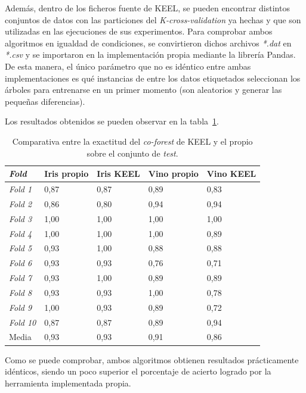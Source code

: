 Además, dentro de los ficheros fuente de KEEL, se pueden encontrar distintos conjuntos de datos con las particiones del \textit{K-cross-validation} ya hechas y que son utilizadas en las ejecuciones de sus experimentos. Para comprobar ambos algoritmos en igualdad de condiciones, se convirtieron dichos archivos \textit{*.dat} en \textit{*.csv} y se importaron en la implementación propia mediante la librería Pandas. De esta manera, el único parámetro que no es idéntico entre ambas implementaciones es qué instancias de entre los datos etiquetados seleccionan los árboles para entrenarse en un primer momento (son aleatorios y generar las pequeñas diferencias).

Los resultados obtenidos se pueden observar en la tabla~\ref{tabla_coforest_keelvsnuestro}.

\begin{table}
	\begin{centering}
		
		\begin{tabular}{@{}p{6em} p{6em} p{6em} p{6em} p{6em} @{}}
			
			\toprule
			\textbf{\textit{Fold}} & \textbf{Iris propio} & \textbf{Iris KEEL} & \textbf{Vino propio} & \textbf{Vino KEEL}\\ 
			\midrule
			\textit{Fold 1} &0,87	&0,87	&0,89	&0,83 \\
			\textit{Fold 2} &0,86	&0,80	&0,94	&0,94 \\
			\textit{Fold 3} &1,00	&1,00	&1,00	&1,00 \\
			\textit{Fold 4} &1,00	&1,00	&1,00	&0,89 \\
			\textit{Fold 5} &0,93	&1,00	&0,88	&0,88 \\
			\textit{Fold 6} &0,93	&0,93	&0,76	&0,71 \\
			\textit{Fold 7} &0,93	&1,00	&0,89	&0,89 \\
			\textit{Fold 8} &0,93	&0,93	&1,00	&0,78 \\
			\textit{Fold 9} &1,00	&0,93	&0,89	&0,72 \\
			\textit{Fold 10}&0,87	&0,87	&0,89	&0,94 \\
			Media 			&0,93	&0,93	&0,91	&0,86 \\
		\end{tabular}
	\end{centering}
	\caption{Comparativa entre la exactitud del \textit{co-forest} de KEEL y el propio sobre el conjunto de \textit{test}.}
	\label{tabla_coforest_keelvsnuestro}	
\end{table}

Como se puede comprobar, ambos algoritmos obtienen resultados prácticamente idénticos, siendo un poco superior el porcentaje de acierto logrado por la herramienta implementada propia.